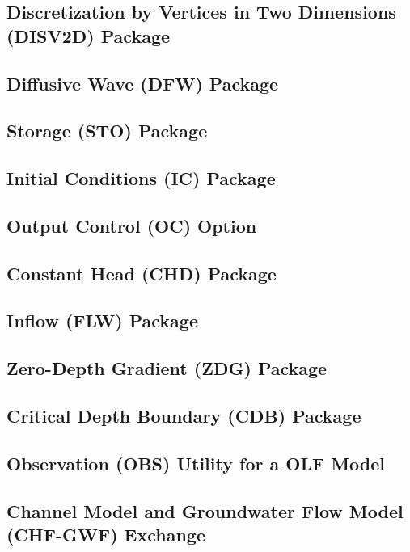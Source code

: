 \newpage
\subsection{Discretization by Vertices in Two Dimensions (DISV2D) Package}


\newpage
\subsection{Diffusive Wave (DFW) Package}


\newpage
\subsection{Storage (STO) Package}


\newpage
\subsection{Initial Conditions (IC) Package}


\newpage
\subsection{Output Control (OC) Option}


\newpage
\subsection{Constant Head (CHD) Package}


\newpage
\subsection{Inflow (FLW) Package}


\newpage
\subsection{Zero-Depth Gradient (ZDG) Package}


\newpage
\subsection{Critical Depth Boundary (CDB) Package}


\newpage
\subsection{Observation (OBS) Utility for a OLF Model}


\newpage
\subsection{Channel Model and Groundwater Flow Model (CHF-GWF) Exchange}


